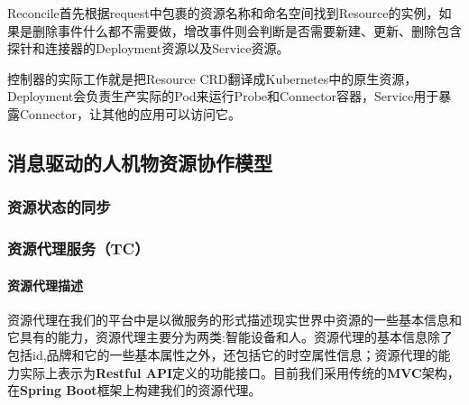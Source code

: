 \documentclass[12pt,a4paper]{article}
\theoremstyle{definition}
\begin{document}
Reconcile首先根据request中包裹的资源名称和命名空间找到Resource的实例，如果是删除事件什么都不需要做，增改事件则会判断是否需要新建、更新、删除包含探针和连接器的Deployment资源以及Service资源。

控制器的实际工作就是把Resource CRD翻译成Kubernetes中的原生资源，Deployment会负责生产实际的Pod来运行Probe和Connector容器，Service用于暴露Connector，让其他的应用可以访问它。

\subsection{消息驱动的人机物资源协作模型}
\subsubsection{资源状态的同步}
\subsubsection{资源代理服务（TC）}
\paragraph{资源代理描述}
资源代理在我们的平台中是以微服务的形式描述现实世界中资源的一些基本信息和它具有的能力，资源代理主要分为两类:智能设备和人。资源代理的基本信息除了包括id,品牌和它的一些基本属性之外，还包括它的时空属性信息；资源代理的能力实际上表示为\textbf{Restful API}定义的功能接口。目前我们采用传统的\textbf{MVC}架构，在\textbf{Spring Boot}框架上构建我们的资源代理。
\end{document}
